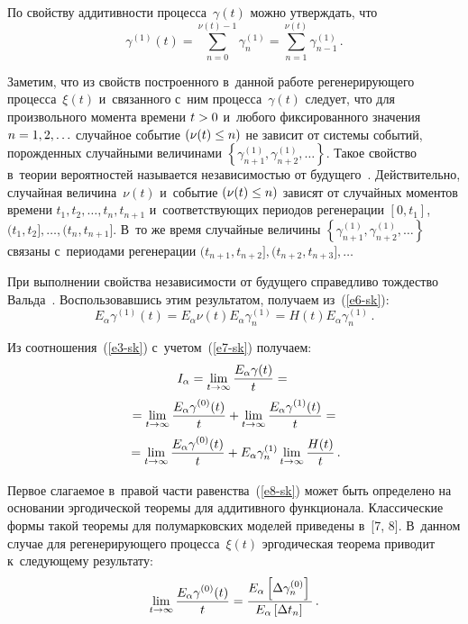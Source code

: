 \begin{multicols}{2}
  По свойству аддитивности процесса~$\gamma(t)$ можно утверж\-дать, что
  \begin{equation}
  \gamma^{(1)}(t)=\sum\limits_{n=0}^{\nu(t)-1} 
\gamma_n^{(1)}=\sum\limits_{n=1}^{\nu(t)} \gamma_{n-1}^{(1)}\,.
  \label{e6-sk}
  \end{equation}
  
  Заметим, что из свойств построенного в~данной работе регенерирующего 
процесса~$\xi(t)$ и~связанного с~ним процесса~$\gamma(t)$ следует, что для 
произвольного момента времени $t\hm>0$ и~любого фиксированного значения 
$n\hm=1,2,\ldots$ случайное событие $(\nu(t)\hm\leq n)$ не зависит от сис\-те\-мы 
событий, по\-рож\-ден\-ных случайными величинами $\left\{ \gamma_{n+1}^{(1)}, 
\gamma^{(1)}_{n+2},\ldots \right\}$. Такое свойство в~тео\-рии вероятностей 
называется не\-за\-ви\-си\-мостью от будущего~\cite{10-sk}. Действительно, 
случайная величина~$\nu(t)$ и~событие $(\nu(t)\hm\leq n)$ зависят от случайных 
моментов времени $t_1, t_2, \ldots , t_n, t_{n+1}$ и~соответствующих периодов 
регенерации $[0, t_1]$, $(t_1, t_2], \ldots , (t_n, t_{n+1}]$. В~то же время 
случайные величины $\left\{ \gamma^{(1)}_{n+1}, \gamma^{(1)}_{n+2}, 
\ldots\right\}$ связаны с~периодами регенерации $(t_{n+1}, t_{n+2}], (t_{n+2}, 
t_{n+3}],\ldots$
  
  При выполнении свойства независимости от будущего справедливо 
тож\-дест\-во Вальда~\cite[гл.~4, \S\,4]{10-sk}. Воспользовавшись этим 
результатом, получаем из~(\ref{e6-sk}):
  \begin{equation}
  E_\alpha \gamma^{(1)}(t)=E_\alpha \nu(t) E_\alpha \gamma_n^{(1)}=H(t) E_\alpha 
\gamma_n^{(1)}\,.
  \label{e7-sk}
  \end{equation}
  
  Из соотношения~(\ref{e3-sk}) с~учетом~(\ref{e7-sk}) получаем:
  \begin{multline}
  I_\alpha= \lim\limits_{t\to \infty} \displaystyle\frac{\displaystyle E_\alpha \gamma(t)\mathstrut}{\displaystyle t\mathstrut}= {}\\
  {}=
\lim\limits_{t\to\infty} \displaystyle\frac{\displaystyle E_\alpha \gamma^{(0)}(t)\mathstrut}{\displaystyle t\mathstrut} +\lim\limits_{t\to\infty} 
\displaystyle\frac{\displaystyle E_\alpha \gamma^{(1)}(t)\mathstrut}{\displaystyle t\mathstrut}={}\\
  {}=
  \lim\limits_{t\to\infty} \displaystyle\frac{\displaystyle E_\alpha \gamma^{(0)}(t)\mathstrut}{\displaystyle t\mathstrut}+E_\alpha 
\gamma_n^{(1)}\lim\limits_{t\to \infty} \displaystyle\frac{\displaystyle H(t)\mathstrut}{\displaystyle t\mathstrut}\,.
  \label{e8-sk}
  \end{multline}
  
  Первое слагаемое в~правой части равенства~(\ref{e8-sk}) может быть 
определено на основании эргодической тео\-ре\-мы для аддитивного функционала. 
Классические формы такой тео\-ре\-мы для полумарковских моделей приведены 
в~[7, 8]. В~данном случае для ре\-ге\-не\-ри\-ру\-юще\-го процесса~$\xi(t)$ эргодическая 
теорема приводит к~сле\-ду\-юще\-му результату:
  \begin{equation}
  \lim\limits_{t\to\infty} \displaystyle\frac{\displaystyle E_\alpha \gamma^{(0)}(t)\mathstrut}{\displaystyle t\mathstrut}= \displaystyle\frac{\displaystyle E_\alpha \left[ 
\Delta \gamma_n^{(0)}\right]\mathstrut}{\displaystyle E_\alpha \left[ \Delta t_n\right]\mathstrut}\,.
  \label{e9-sk}
  \end{equation}
  

\end{multicols}
